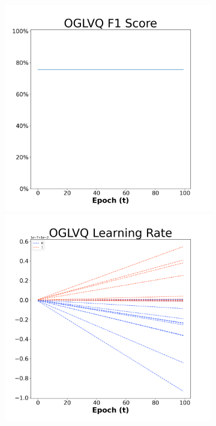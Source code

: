 \begin{figure}[H]
    \centering %
\begin{subfigure}{0.3\textwidth}
  \includegraphics[width=\linewidth]{images/exper2/NSP/OGLVQ_0.01_f1.png}
    \includegraphics[width=\linewidth]{images/exper2/NSP/OGLVQ_0.01_lr.png}

\end{subfigure}
\end{figure}
